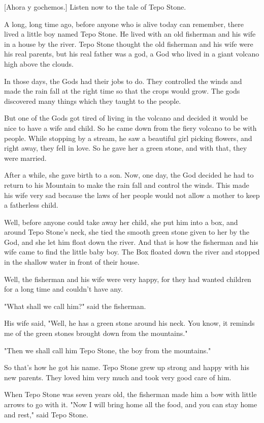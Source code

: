     [Ahora y gochemos.] Listen now to the tale of Tepo Stone.

A long, long time ago, before anyone who is alive today can remember, there lived a little boy named Tepo Stone. He lived with an old fisherman and his wife in a house by the river. Tepo Stone thought the old fisherman and his wife were his real parents, but his real father was a god, a God who lived in a giant volcano high above the clouds.

In those days, the Gods had their jobs to do. They controlled the winds and made the rain fall at the right time so that the crops would grow. The gods discovered many things which they taught to the people.

But one of the Gods got tired of living in the volcano and decided it would be nice to have a wife and child. So he came down from the fiery volcano to be with people. While stopping by a stream, he saw a beautiful girl picking flowers, and right away, they fell in love. So he gave her a green stone, and with that, they were married.

After a while, she gave birth to a son. Now, one day, the God decided he had to return to his Mountain to make the rain fall and control the winds. This made his wife very sad because the laws of her people would not allow a mother to keep a fatherless child.

Well, before anyone could take away her child, she put him into a box, and around Tepo Stone's neck, she tied the smooth green stone given to her by the God, and she let him float down the river. And that is how the fisherman and his wife came to find the little baby boy. The Box floated down the river and stopped in the shallow water in front of their house.

Well, the fisherman and his wife were very happy, for they had wanted children for a long time and couldn't have any.

"What shall we call him?" said the fisherman.

His wife said, "Well, he has a green stone around his neck. You know, it reminds me of the green stones brought down from the mountains."

"Then we shall call him Tepo Stone, the boy from the mountains."

So that's how he got his name. Tepo Stone grew up strong and happy with his new parents. They loved him very much and took very good care of him.

When Tepo Stone was seven years old, the fisherman made him a bow with little arrows to go with it. "Now I will bring home all the food, and you can stay home and rest," said Tepo Stone.

